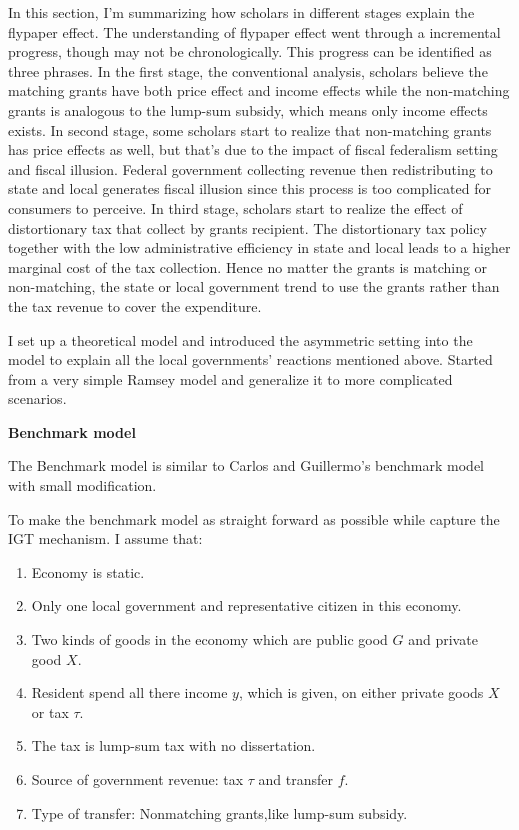 In this section, I’m summarizing how scholars in different stages explain the flypaper effect. The understanding of flypaper effect went through a incremental progress, though may not be chronologically. This progress can be identified as three phrases. In the first stage, the conventional analysis, scholars believe the matching grants have both price effect and income effects while the non-matching grants is analogous to the lump-sum subsidy, which means only income effects exists. In second stage, some scholars start to realize that non-matching grants has price effects as well, but that’s due to the impact of fiscal federalism setting and fiscal illusion. Federal government collecting revenue then redistributing to state and local generates fiscal illusion since this process is too complicated for consumers to perceive. In third stage, scholars start to realize the effect of distortionary tax that collect by grants recipient. The distortionary tax policy together with the low administrative efficiency in state and local leads to a higher marginal cost of the tax collection. Hence no matter the grants is matching or non-matching, the state or local government trend to use the grants rather than the tax revenue to cover the expenditure.

I set up a theoretical model and introduced the asymmetric setting into the model to explain all the local governments' reactions mentioned above. Started from a very simple Ramsey model and generalize it to more complicated scenarios.

\textbf{Benchmark model}

The Benchmark model is similar to Carlos and Guillermo's \cite{vegh2016unsticking} benchmark model with small modification.

To make the benchmark model as straight forward as possible while capture the IGT mechanism. I assume that:

\begin{enumerate}
    \item Economy is static.
    \item Only one local government and representative citizen in this economy.
    \item Two kinds of goods in the economy which are public good $G$ \label{G} and private good $X$.\label{X}
    \item Resident spend all there income $y$, which is given, on either private goods $X$ or tax $\tau$.\label{y}
    \item The tax is lump-sum tax with no dissertation.
    \item Source of government revenue: tax $\tau$ and transfer $f$.\label{f}
    \item Type of transfer: Nonmatching grants,like lump-sum subsidy.
\end{enumerate}

